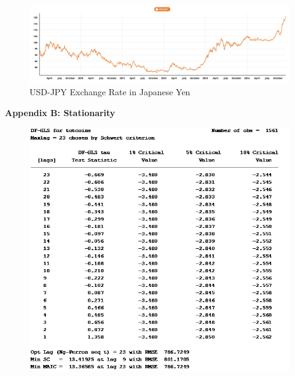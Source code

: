 \documentclass{article}[10 pt]
\newcommand{\vs}{\vspace{0.1in}}
\begin{document}
\vs

\begin{figure}[ht!]

\centering

\includegraphics[width=150mm]{USD_JPY.png}

\caption{USD-JPY Exchange Rate in Japanese Yen}

\label{overflow}

\end{figure}

\clearpage

\textbf{Appendix B: Stationarity}

\vspace{5mm}

\begin{figure}[ht!]

\centering

\includegraphics[width=150mm]{df_totcoins.png}

\label{overflow}

\end{figure}
\end{document}
